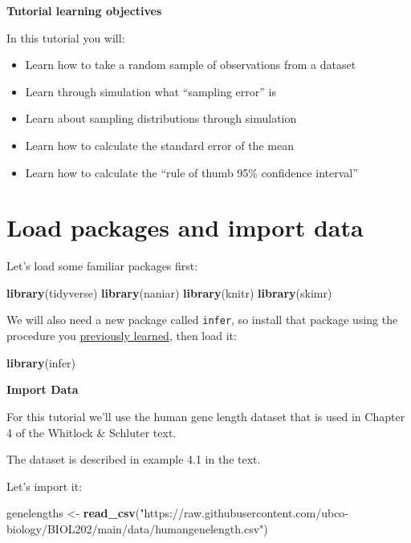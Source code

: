 \documentclass[
]{book}
\newenvironment{Shaded}{\begin{snugshade}}{\end{snugshade}}
\newcommand{\FunctionTok}[1]{\textcolor[rgb]{0.13,0.29,0.53}{\textbf{#1}}}
\newcommand{\NormalTok}[1]{#1}
\newcommand{\OtherTok}[1]{\textcolor[rgb]{0.56,0.35,0.01}{#1}}
\newcommand{\StringTok}[1]{\textcolor[rgb]{0.31,0.60,0.02}{#1}}
\providecommand{\tightlist}{%
  \setlength{\itemsep}{0pt}\setlength{\parskip}{0pt}}
\begin{document}
\textbf{Tutorial learning objectives}

In this tutorial you will:

\begin{itemize}
\tightlist
\item
  Learn how to take a random sample of observations from a dataset
\item
  Learn through simulation what ``sampling error'' is
\item
  Learn about sampling distributions through simulation
\item
  Learn how to calculate the standard error of the mean
\item
  Learn how to calculate the ``rule of thumb 95\% confidence interval''
\end{itemize}

\section{Load packages and import data}\label{estimation_packages_data}

Let's load some familiar packages first:

\begin{Shaded}
\begin{Highlighting}[]
\FunctionTok{library}\NormalTok{(tidyverse)}
\FunctionTok{library}\NormalTok{(naniar)}
\FunctionTok{library}\NormalTok{(knitr)}
\FunctionTok{library}\NormalTok{(skimr)}
\end{Highlighting}
\end{Shaded}

We will also need a new package called \texttt{infer}, so install that package using the procedure you \hyperref[package_install]{previously learned}, then load it:

\begin{Shaded}
\begin{Highlighting}[]
\FunctionTok{library}\NormalTok{(infer)}
\end{Highlighting}
\end{Shaded}

\textbf{Import Data}

For this tutorial we'll use the human gene length dataset that is used in Chapter 4 of the Whitlock \& Schluter text.

The dataset is described in example 4.1 in the text.

Let's import it:

\begin{Shaded}
\begin{Highlighting}[]
\NormalTok{genelengths }\OtherTok{\textless{}{-}} \FunctionTok{read\_csv}\NormalTok{(}\StringTok{"https://raw.githubusercontent.com/ubco{-}biology/BIOL202/main/data/humangenelength.csv"}\NormalTok{)}
\end{Highlighting}
\end{Shaded}
\end{document}
